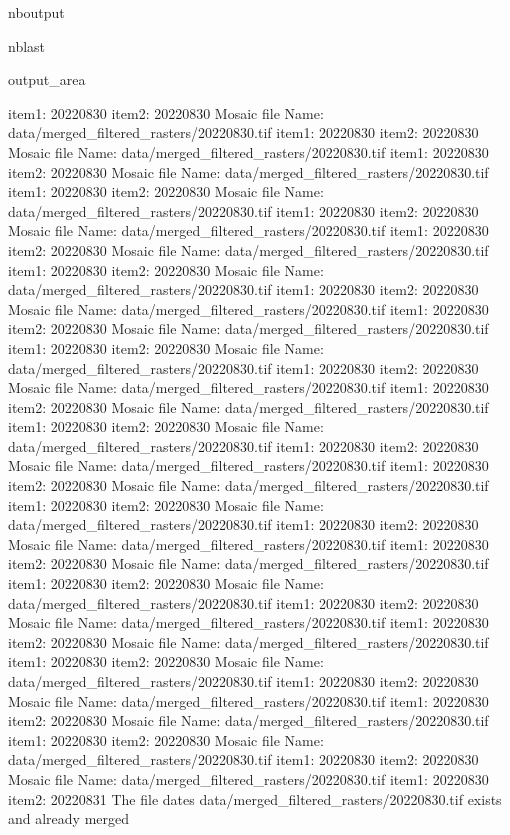 \documentclass[letterpaper,10pt]{sphinxmanual}
\begin{document}
\begin{sphinxuseclass}{nboutput}
\begin{sphinxuseclass}{nblast}
{\begin{sphinxuseclass}{output_area}
\begin{sphinxuseclass}{}
\begin{sphinxVerbatim}[commandchars=\\\{\}]
item1:  20220830
item2:  20220830
Mosaic file Name:  data/merged\_filtered\_rasters/20220830.tif
item1:  20220830
item2:  20220830
Mosaic file Name:  data/merged\_filtered\_rasters/20220830.tif
item1:  20220830
item2:  20220830
Mosaic file Name:  data/merged\_filtered\_rasters/20220830.tif
item1:  20220830
item2:  20220830
Mosaic file Name:  data/merged\_filtered\_rasters/20220830.tif
item1:  20220830
item2:  20220830
Mosaic file Name:  data/merged\_filtered\_rasters/20220830.tif
item1:  20220830
item2:  20220830
Mosaic file Name:  data/merged\_filtered\_rasters/20220830.tif
item1:  20220830
item2:  20220830
Mosaic file Name:  data/merged\_filtered\_rasters/20220830.tif
item1:  20220830
item2:  20220830
Mosaic file Name:  data/merged\_filtered\_rasters/20220830.tif
item1:  20220830
item2:  20220830
Mosaic file Name:  data/merged\_filtered\_rasters/20220830.tif
item1:  20220830
item2:  20220830
Mosaic file Name:  data/merged\_filtered\_rasters/20220830.tif
item1:  20220830
item2:  20220830
Mosaic file Name:  data/merged\_filtered\_rasters/20220830.tif
item1:  20220830
item2:  20220830
Mosaic file Name:  data/merged\_filtered\_rasters/20220830.tif
item1:  20220830
item2:  20220830
Mosaic file Name:  data/merged\_filtered\_rasters/20220830.tif
item1:  20220830
item2:  20220830
Mosaic file Name:  data/merged\_filtered\_rasters/20220830.tif
item1:  20220830
item2:  20220830
Mosaic file Name:  data/merged\_filtered\_rasters/20220830.tif
item1:  20220830
item2:  20220830
Mosaic file Name:  data/merged\_filtered\_rasters/20220830.tif
item1:  20220830
item2:  20220830
Mosaic file Name:  data/merged\_filtered\_rasters/20220830.tif
item1:  20220830
item2:  20220830
Mosaic file Name:  data/merged\_filtered\_rasters/20220830.tif
item1:  20220830
item2:  20220830
Mosaic file Name:  data/merged\_filtered\_rasters/20220830.tif
item1:  20220830
item2:  20220830
Mosaic file Name:  data/merged\_filtered\_rasters/20220830.tif
item1:  20220830
item2:  20220830
Mosaic file Name:  data/merged\_filtered\_rasters/20220830.tif
item1:  20220830
item2:  20220830
Mosaic file Name:  data/merged\_filtered\_rasters/20220830.tif
item1:  20220830
item2:  20220830
Mosaic file Name:  data/merged\_filtered\_rasters/20220830.tif
item1:  20220830
item2:  20220830
Mosaic file Name:  data/merged\_filtered\_rasters/20220830.tif
item1:  20220830
item2:  20220830
Mosaic file Name:  data/merged\_filtered\_rasters/20220830.tif
item1:  20220830
item2:  20220830
Mosaic file Name:  data/merged\_filtered\_rasters/20220830.tif
item1:  20220830
item2:  20220831
The file dates data/merged\_filtered\_rasters/20220830.tif exists and already merged

\end{sphinxVerbatim}
\end{sphinxuseclass}
\end{sphinxuseclass}}
\end{sphinxuseclass}
\end{sphinxuseclass}
\end{document}
